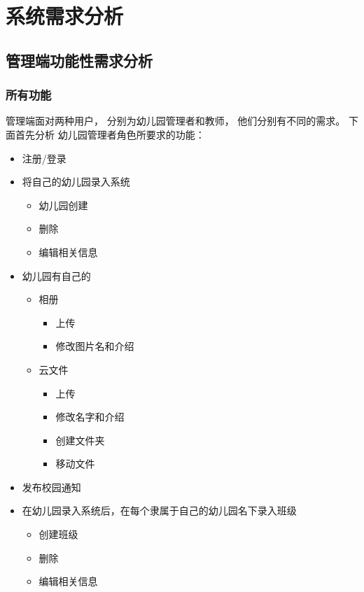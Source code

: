 \chapter{系统需求分析}

\section{ 管理端功能性需求分析}

\subsection{所有功能}

管理端面对两种用户， 分别为幼儿园管理者和教师， 他们分别有不同的需求。 下面首先分析 幼儿园管理者角色所要求的功能：

\begin{itemize}

\item 注册/登录

\item 将自己的幼儿园录入系统

\begin{itemize}
	\item 幼儿园创建
	\item 删除
	\item 编辑相关信息
\end{itemize}


\item 幼儿园有自己的
\begin{itemize}
	\item 相册
	\begin{itemize}
		\item 上传
		\item 修改图片名和介绍
	\end{itemize}
	\item 云文件
	\begin{itemize}
		\item 上传
		\item 修改名字和介绍
	 	\item 创建文件夹
		\item 移动文件
	\end{itemize}
\end{itemize}


\item 发布校园通知

\item 在幼儿园录入系统后，在每个隶属于自己的幼儿园名下录入班级
\begin{itemize}
	\item 创建班级
	\item 删除
	\item 编辑相关信息
\end{itemize}


\end{itemize}
